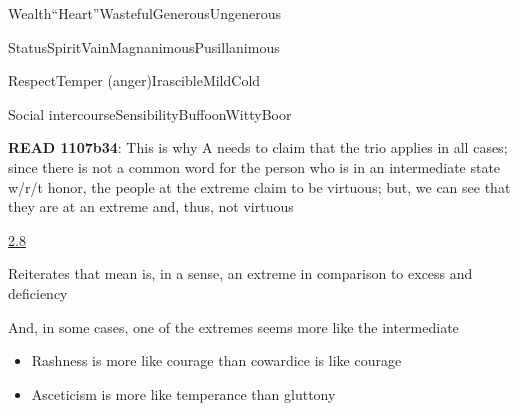 \documentclass[11pt]{article}
\begin{document}
\noindent Wealth\hspace*{22mm}``Heart''\hspace*{22mm}Wasteful\hspace*{14mm}Generous\hspace*{12mm}Ungenerous
\vspace*{1mm}

\noindent Status\hspace*{24mm}Spirit\hspace*{27mm}Vain\hspace*{16mm}Magnanimous\hspace*{7mm}Pusillanimous
\vspace*{1mm}

\noindent Respect\hspace*{21mm}Temper (anger)\hspace*{11mm}Irascible\hspace*{16mm}Mild\hspace*{21mm}Cold
\vspace*{1mm}

\noindent Social intercourse\hspace*{6mm}Sensibility\hspace*{18mm}Buffoon\hspace*{16mm}Witty\hspace*{21mm}Boor
\vspace*{4mm}

\noindent\textbf{READ 1107b34}: This is why A needs to claim that the trio applies in all cases; since there is not a common word for the person who is in an intermediate state w/r/t honor, the people at the extreme claim to be virtuous; but, we can see that they are at an extreme and, thus, not virtuous
\vspace*{4mm}

\noindent\underline{2.8}
\vspace*{2mm}

\noindent Reiterates that mean is, in a sense, an extreme in comparison to excess and deficiency
\vspace*{2mm}

\noindent And, in some cases, one of the extremes seems more like the intermediate

\begin{itemize}\item{Rashness is more like courage than cowardice is like courage}\item{Asceticism is more like temperance than gluttony}\end{itemize}
\end{document}
